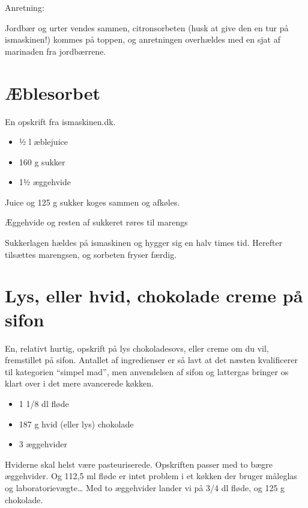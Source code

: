 \documentclass[
  letterpaper,
  DIV=11,
  numbers=noendperiod]{scrreprt}
\providecommand{\tightlist}{%
  \setlength{\itemsep}{0pt}\setlength{\parskip}{0pt}}\usepackage{longtable,booktabs,array}
\begin{document}
Anretning:

Jordbær og urter vendes sammen, citronsorbeten (husk at give den en tur
på ismaskinen!) kommes på toppen, og anretningen overhældes med en sjat
af marinaden fra jordbærrene.

\hypertarget{uxe6blesorbet}{%
\section{Æblesorbet}\label{uxe6blesorbet}}

En opskrift fra ismaskinen.dk.

\begin{itemize}
\tightlist
\item
  ½ l æblejuice
\item
  160 g sukker
\item
  1½ æggehvide
\end{itemize}

Juice og 125 g sukker koges sammen og afkøles.~

Æggehvide og resten af sukkeret røres til marengs

Sukkerlagen hældes på ismaskinen og hygger sig en halv times tid.
Herefter tilsættes marengsen, og sorbeten fryser færdig.

\hypertarget{lys-eller-hvid-chokolade-creme-puxe5-sifon}{%
\section{Lys, eller hvid, chokolade creme på
sifon}\label{lys-eller-hvid-chokolade-creme-puxe5-sifon}}

En, relativt hurtig, opskrift på lys chokoladesovs, eller creme om du
vil, fremstillet på sifon. Antallet af ingredienser er så lavt at det
næsten kvalificerer til kategorien ``simpel mad'', men anvendelsen af
sifon og lattergas bringer os klart over i det mere avancerede køkken.

\begin{itemize}
\tightlist
\item
  1 1/8 dl fløde
\item
  187 g hvid (eller lys) chokolade
\item
  3 æggehvider
\end{itemize}

Hviderne skal helst være pasteuriserede. Opskriften passer med to bægre
æggehvider. Og 112,5 ml fløde er intet problem i et køkken der bruger
måleglas og laboratorievægte\ldots{} Med to æggehvider lander vi på 3/4
dl fløde, og 125 g chokolade.
\end{document}
